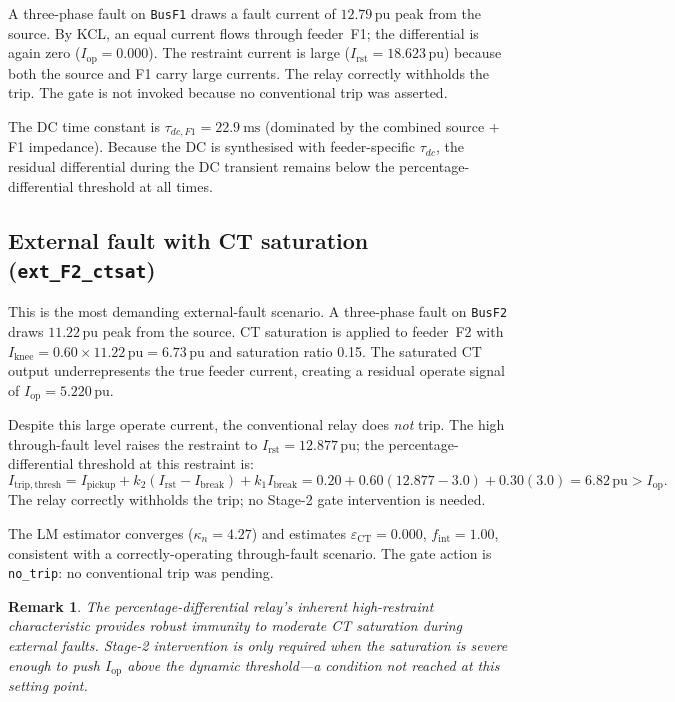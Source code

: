 \documentclass[12pt,a4paper]{article}
\newtheorem{remark}{Remark}[section]
\newcommand{\kappan}{\kappa_n}
\newcommand{\Iop}{I_{\mathrm{op}}}
\newcommand{\Irst}{I_{\mathrm{rst}}}
\newcommand{\fint}{f_{\mathrm{int}}}
\newcommand{\eCT}{\varepsilon_{\mathrm{CT}}}
\begin{document}
A three-phase fault on \texttt{BusF1} draws a fault current of
$12.79\,\mathrm{pu}$ peak from the source.  By KCL, an equal current flows
through feeder~F1; the differential is again zero ($\Iop = 0.000$).  The
restraint current is large ($\Irst = 18.623\,\mathrm{pu}$) because both the
source and F1 carry large currents.  The relay correctly withholds the trip.
The gate is not invoked because no conventional trip was asserted.

The DC time constant is $\tau_{dc,F1} = \SI{22.9}{\milli\second}$ (dominated
by the combined source + F1 impedance).  Because the DC is synthesised with
feeder-specific $\tau_{dc}$, the residual differential during the DC transient
remains below the percentage-differential threshold at all times.

\subsection{External fault with CT saturation (\texttt{ext\_F2\_ctsat})}
\label{sec:ctsat}

This is the most demanding external-fault scenario.  A three-phase fault on
\texttt{BusF2} draws $11.22\,\mathrm{pu}$ peak from the source.  CT saturation
is applied to feeder~F2 with $I_{\mathrm{knee}} = 0.60\times11.22\,\mathrm{pu}
= 6.73\,\mathrm{pu}$ and saturation ratio 0.15.  The saturated CT output
underrepresents the true feeder current, creating a residual operate signal of
$\Iop = 5.220\,\mathrm{pu}$.

Despite this large operate current, the conventional relay does \emph{not}
trip.  The high through-fault level raises the restraint to
$\Irst = 12.877\,\mathrm{pu}$; the percentage-differential threshold at this
restraint is:
\begin{equation}
  I_{\mathrm{trip,thresh}}
  = I_{\mathrm{pickup}} + k_2(\Irst - I_{\mathrm{break}})
    + k_1 I_{\mathrm{break}}
  = 0.20 + 0.60(12.877-3.0) + 0.30(3.0)
  = 6.82\,\mathrm{pu} > \Iop.
\end{equation}
The relay correctly withholds the trip; no Stage-2 gate intervention is needed.

The LM estimator converges ($\kappan = 4.27$) and estimates $\eCT = 0.000$,
$\fint = 1.00$, consistent with a correctly-operating through-fault scenario.
The gate action is \texttt{no\_trip}: no conventional trip was pending.

\begin{remark}
  The percentage-differential relay's inherent high-restraint characteristic
  provides robust immunity to moderate CT saturation during external faults.
  Stage-2 intervention is only required when the saturation is severe enough to
  push $\Iop$ above the dynamic threshold—a condition not reached at this
  setting point.
\end{remark}
\end{document}
